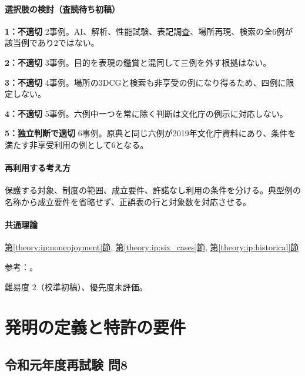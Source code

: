 \paragraph{選択肢の検討（査読待ち初稿）}\mbox{}\par

\noindent\textbf{1：不適切} 2事例。AI、解析、性能試験、表記調査、場所再現、検索の全6例が該当例であり2ではない。\par

\noindent\textbf{2：不適切} 3事例。目的を表現の鑑賞と混同して三例を外す根拠はない。\par

\noindent\textbf{3：不適切} 4事例。場所の3DCGと検索も非享受の例になり得るため、四例に限定しない。\par

\noindent\textbf{4：不適切} 5事例。六例中一つを常に除く判断は文化庁の例示に対応しない。\par

\noindent\textbf{5：独立判断で適切} 6事例。原典と同じ六例が2019年文化庁資料にあり、条件を満たす非享受利用の例として6となる。\par

\paragraph{再利用する考え方} 保護する対象、制度の範囲、成立要件、許諾なし利用の条件を分ける。典型例の名称から成立要件を省略せず、正誤表の行と対象数を対応させる。

\paragraph{共通理論} \hyperref[theory:ip:nonenjoyment]{第\ref*{theory:ip:nonenjoyment}節}, \hyperref[theory:ip:six_cases]{第\ref*{theory:ip:six_cases}節}, \hyperref[theory:ip:historical]{第\ref*{theory:ip:historical}節}

\par 参考：\cite{ip_flexible2019,bunka_amend2018,ip_copyright_statute}。

\par 難易度 2（校準初稿）、優先度未評価。

\section{発明の定義と特許の要件}

\subsection{令和元年度再試験 問8}
\label{q:r01-ret-apt-08}

